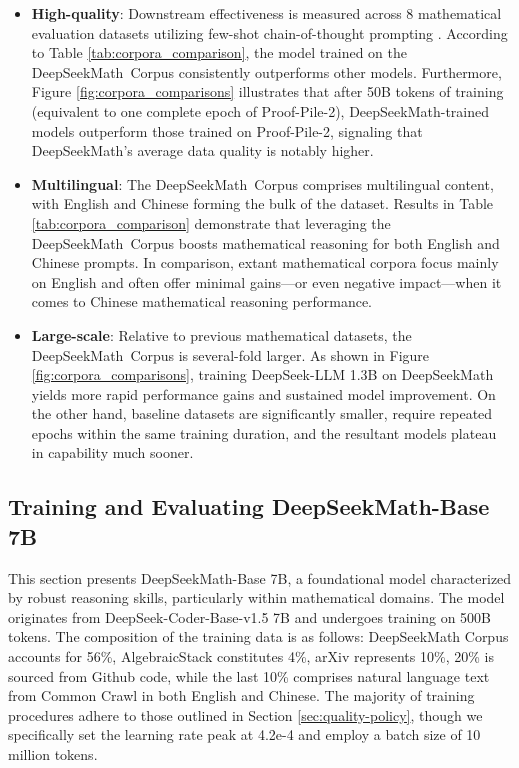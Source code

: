 \begin{itemize}[topsep=0pt]
    \item \textbf{High-quality}:
    Downstream effectiveness is measured across 8 mathematical evaluation datasets utilizing few-shot chain-of-thought prompting \cite{cot}. According to Table \ref{tab:corpora_comparison}, the model trained on the DeepSeekMath~Corpus consistently outperforms other models. Furthermore, Figure \ref{fig:corpora_comparisons} illustrates that after 50B tokens of training (equivalent to one complete epoch of Proof-Pile-2), DeepSeekMath-trained models outperform those trained on Proof-Pile-2, signaling that DeepSeekMath’s average data quality is notably higher.
    \item \textbf{Multilingual}:
    The DeepSeekMath~Corpus comprises multilingual content, with English and Chinese forming the bulk of the dataset. Results in Table \ref{tab:corpora_comparison} demonstrate that leveraging the DeepSeekMath~Corpus boosts mathematical reasoning for both English and Chinese prompts. In comparison, extant mathematical corpora focus mainly on English and often offer minimal gains—or even negative impact—when it comes to Chinese mathematical reasoning performance.
    \item \textbf{Large-scale}:
    Relative to previous mathematical datasets, the DeepSeekMath~Corpus is several-fold larger. As shown in Figure \ref{fig:corpora_comparisons}, training DeepSeek-LLM 1.3B on DeepSeekMath yields more rapid performance gains and sustained model improvement. On the other hand, baseline datasets are significantly smaller, require repeated epochs within the same training duration, and the resultant models plateau in capability much sooner.
\end{itemize}

\subsection{Training and Evaluating DeepSeekMath-Base 7B}

This section presents DeepSeekMath-Base 7B, a foundational model characterized by robust reasoning skills, particularly within mathematical domains. The model originates from DeepSeek-Coder-Base-v1.5 7B \citep{deepseek-coder} and undergoes training on 500B tokens. The composition of the training data is as follows: DeepSeekMath Corpus accounts for 56\%, AlgebraicStack constitutes 4\%, arXiv represents 10\%, 20\% is sourced from Github code, while the last 10\% comprises natural language text from Common Crawl in both English and Chinese. The majority of training procedures adhere to those outlined in Section \ref{sec:quality-policy}, though we specifically set the learning rate peak at 4.2e-4 and employ a batch size of 10 million tokens.

